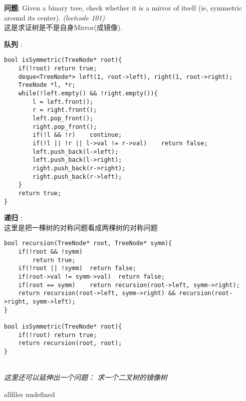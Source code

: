 \documentclass{article}
\begin{document}
\begin{CJK}{UTF8}{gbsn}     %

\else
	
\begin{description}
	\item{\textbf{问题}}: Given a binary tree, check whether it is a mirror of itself (ie, symmetric around its center). \textit{(leetcode 101)}
	\\这是求证树是不是自身Mirror(成镜像).
	\item{\textbf{队列}} : 
	\begin{lstlisting}
bool isSymmetric(TreeNode* root){
	if(!root) return true;
	deque<TreeNode*> left(1, root->left), right(1, root->right);
	TreeNode *l, *r;
	while(!left.empty() && !right.empty()){
		l = left.front();
		r = right.front();
		left.pop_front();
		right.pop_front();
		if(!l && !r)	continue;
		if(!l || !r || l->val != r->val)	return false;
		left.push_back(l->left);
		left.push_back(l->right);
		right.push_back(r->right);
		right.push_back(r->left);
	}
	return true;
}
	\end{lstlisting}
	\item{\textbf{递归}} : 
	\\这里是把一棵树的对称问题看成两棵树的对称问题
	\begin{lstlisting}
bool recursion(TreeNode* root, TreeNode* symm){
	if(!root && !symm)
		return true;
	if(!root || !symm)	return false;
	if(root->val != symm->val)	return false;
	if(root == symm)	return recursion(root->left, symm->right);
	return recursion(root->left, symm->right) && recursion(root->right, symm->left);
}

bool isSymmetric(TreeNode* root){
	if(!root) return true;
	return recursion(root, root);
}
	\end{lstlisting}
	\textit{\\这里还可以延伸出一个问题： 求一个二叉树的镜像树}
\end{description}

\fi

\ifx allfiles undefined
\end{CJK}
\end{document}
